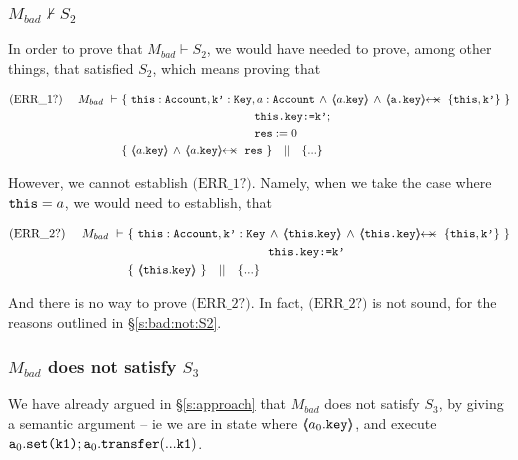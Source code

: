 \subsubsection{$M_{bad}  \nvdash S_2$}
\label{s:bad:not:S2:proof}

In order to prove that $M_{bad}  \vdash S_2$, we would have needed to prove, among other things,  that  satisfied $S_2$, which means proving that

\small{
\begin{align*}
\text{(ERR\_1?)}  \ \ \ \ M_{bad}\ \vdash \ 
		&	\{  \ \prg{this}:\prg{Account}, \prg{k'}:\prg{Key}, a:\prg{Account}\, \wedge\, \inside{a.\prg{key}}  \, \wedge \, \protectedFrom {\prg{a.key}} { \{\prg{this},\prg{k'}\} }\   \} \\
			& \SPT \SPT   \SPT\SPT  \prg{this.key:=k'}; \\
			& \SPT \SPT   \SPT\SPT \prg{res}:=0 \\ 
	       	& \{ \  \inside{a.\prg{key}}  \, \wedge \, \protectedFrom {a.\prg{key}} {\prg{res}} \   \} \ \ \  || \ \ \ 
		   \{ ... \}
\end{align*}
}

However, we cannot  establish $\text{(ERR\_1?)}$.
Namely, when we  take the case where $\mbox{\normalfont{\texttt{this}}}=a$,  we would need to establish, that

\small{
\begin{align*}
\text{(ERR\_2?)}  \ \ \ \ M_{bad}\ \vdash \ 
		&	\{  \ \prg{this}:\prg{Account}, \prg{k'}:\prg{Key}\, \wedge\, \inside{\prg{this}.\prg{key}}  \, \wedge \, \protectedFrom {\prg{this.key}} { \{\prg{this},\prg{k'}\} }\   \} \\
			& \SPT \SPT   \SPT\SPT  \prg{this.key:=k'}  \\
	       	& \{ \ \inside{\prg{this}.\prg{key}}  \   \} \ \ \  || \ \ \ 
		   \{ ... \}
\end{align*}
} 

And there is no way to prove $\text{(ERR\_2?)}$. In fact, $\text{(ERR\_2?)}$  is not sound, for the reasons outlined in \S \ref{s:bad:not:S2}.

\subsubsection{$M_{bad}$ does not satisfy $S_3$}

We have already argued in \S \ref{s:approach} that $M_{bad}$ does not satisfy $S_3$, by giving a semantic argument -- ie we are in state where $ \langle\!\!\langle a_0.\mbox{\normalfont{\texttt{key}}} \rangle\!\!\rangle$, and execute $\mbox{\normalfont{\texttt{a}}}_0.\mbox{\normalfont{\texttt{set(k1)}}}; \mbox{\normalfont{\texttt{a}}}_0.\mbox{\normalfont{\texttt{transfer}}}(...\mbox{\normalfont{\texttt{k1}}})$. 


